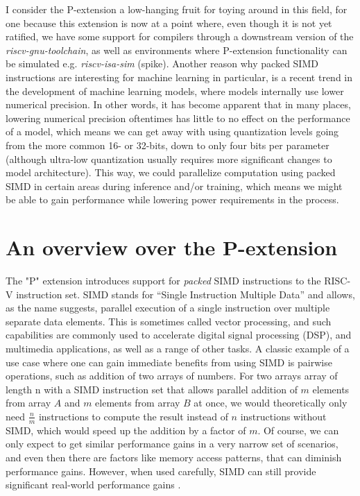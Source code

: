 \documentclass[a4paper,oneside,10pt,ngerman,english]{scrartcl}
\begin{document}
I consider the P-extension a low-hanging fruit for toying around in this field, for one because this extension is now at a point where, even though it is not yet ratified, we have some support for compilers through a downstream version of the \emph{riscv-gnu-toolchain}, as well as environments where P-extension functionality can be simulated e.g. \emph{riscv-isa-sim} (spike). Another reason why packed SIMD instructions are interesting for machine learning in particular, is a recent trend in the development of machine learning models, where models internally use lower numerical precision. In other words, it has become apparent that in many places, lowering numerical precision oftentimes has little to no effect on the performance of a model, which means we can get away with using quantization levels going from the more common 16- or 32-bits, down to only four bits per parameter (although ultra-low quantization usually requires more significant changes to model architecture). This way, we could parallelize computation using packed SIMD in certain areas during inference and/or training, which means we might be able to gain performance while lowering power requirements in the process.


\section{An overview over the P-extension}
\label{sec:overview}
The "P" extension introduces support for \emph{packed} SIMD instructions to the RISC-V instruction set. SIMD stands for “Single Instruction Multiple Data” and allows, as the name suggests, parallel execution of a single instruction over multiple separate data elements. This is sometimes called vector processing, and such capabilities are commonly used to accelerate digital signal processing (DSP), and multimedia applications, as well as a range of other tasks. A classic example of a use case where one can gain immediate benefits from using SIMD is pairwise operations, such as addition of two arrays of numbers. For two arrays array of length n with a SIMD instruction set that allows parallel addition of $ m $ elements from array $ A $ and $ m $ elements from array $ B $ at once, we would theoretically only need $ \frac{n}{m} $ instructions to compute the result instead of $ n $ instructions without SIMD, which would speed up the addition by a factor of $ m $. Of course, we can only expect to get similar performance gains in a very narrow set of scenarios, and even then there are factors like memory access patterns, that can diminish performance gains. However, when used carefully, SIMD can still provide significant real-world performance gains
\cite{simd_access_patterns}.
\end{document}
